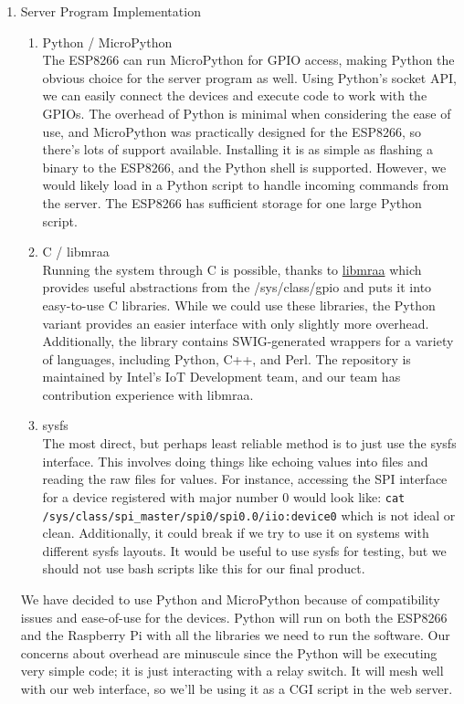 \begin{enumerate}
    \item Server Program Implementation
        \begin{enumerate}
            \item Python / MicroPython \\
            The ESP8266 can run MicroPython for GPIO access, making Python the obvious choice for the server program as well. Using Python's socket API, we can easily connect the devices and execute code to work with the GPIOs. The overhead of Python is minimal when considering the ease of use, and MicroPython was practically designed for the ESP8266, so there's lots of support available. Installing it is as simple as flashing a binary to the ESP8266, and the Python shell is supported. However, we would likely load in a Python script to handle incoming commands from the server. The ESP8266 has sufficient storage for one large Python script.
            \item C / libmraa \\
            Running the system through C is possible, thanks to \href{https://github.com/intel-iot-devkit/mraa}{libmraa} which provides useful abstractions from the /sys/class/gpio and puts it into easy-to-use C libraries. While we could use these libraries, the Python variant provides an easier interface with only slightly more overhead. Additionally, the library contains SWIG-generated wrappers for a variety of languages, including Python, C++, and Perl. The repository is maintained by Intel's IoT Development team, and our team has contribution experience with libmraa. 
            \item sysfs \\
            The most direct, but perhaps least reliable method is to just use the sysfs interface. This involves doing things like echoing values into files and reading the raw files for values. For instance, accessing the SPI interface for a device registered with major number 0 would look like: \verb|cat /sys/class/spi_master/spi0/spi0.0/iio:device0| which is not ideal or clean. Additionally, it could break if we try to use it on systems with different sysfs layouts. It would be useful to use sysfs for testing, but we should not use bash scripts like this for our final product. 
        \end{enumerate}
        We have decided to use Python and MicroPython because of compatibility issues and ease-of-use for the devices. Python will run on both the ESP8266 and the Raspberry Pi with all the libraries we need to run the software. Our concerns about overhead are minuscule since the Python will be executing very simple code; it is just interacting with a relay switch. It will mesh well with our web interface, so we'll be using it as a CGI script in the web server.

\end{enumerate}
